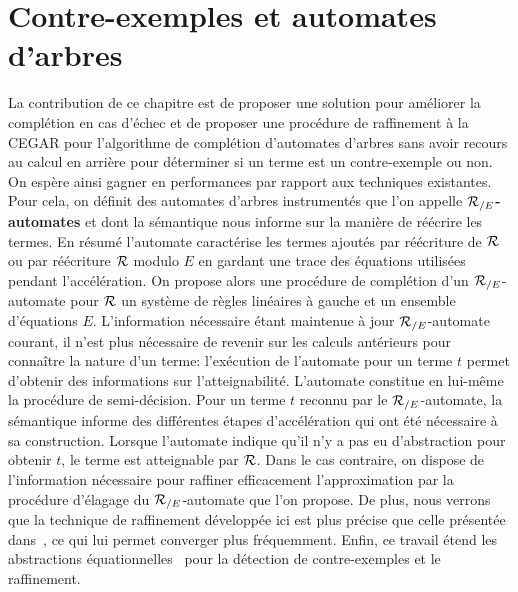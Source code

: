 
\section{Contre-exemples et automates d'arbres}

La contribution de ce chapitre est de proposer une solution pour améliorer
la complétion en cas d'échec et de proposer une procédure de raffinement
à la CEGAR pour l'algorithme de complétion d'automates d'arbres sans avoir recours 
au calcul en arrière pour déterminer si un terme est un contre-exemple ou non.
On espère ainsi gagner en performances par rapport aux techniques existantes.
Pour cela, on définit des automates d'arbres instrumentés que
l'on appelle \textbf{${\mathcal R_{/E}}$-automates} et dont la sémantique 
nous informe sur la manière de réécrire les termes.
En résumé l'automate caractérise les termes ajoutés par réécriture
de $\mathcal R$ ou par réécriture $\mathcal R$ modulo $E$ en gardant une trace
des équations utilisées pendant l'accélération.
On propose alors une procédure de complétion d'un ${\mathcal R_{/E}}$-automate
pour $\mathcal R$ un système de règles linéaires à gauche et un ensemble d'équations $E$.
L'information nécessaire étant maintenue à jour ${\mathcal R_{/E}}$-automate courant, 
il n'est plus nécessaire de revenir sur les calculs antérieurs pour
connaître la nature d'un terme: l'exécution de l'automate pour un terme $t$
permet d'obtenir des informations sur l'atteignabilité. L'automate constitue en lui-même
la procédure de semi-décision.
Pour un terme $t$ reconnu par le ${\mathcal R_{/E}}$-automate, la sémantique informe des différentes étapes
d'accélération qui ont été nécessaire à sa construction. Lorsque l'automate indique qu'il n'y a
pas eu d'abstraction pour obtenir $t$, le terme est atteignable par $\mathcal R$.  Dans le cas
contraire, on dispose de l'information nécessaire pour raffiner efficacement l'approximation par la procédure 
d'élagage du ${\mathcal R_{/E}}$-automate que l'on propose.
De plus, nous verrons que la technique de raffinement développée ici est plus
précise que celle présentée dans~\cite{BCHK08}, ce qui lui permet  
converger plus fréquemment. Enfin, ce travail étend les abstractions
équationnelles~\cite{MeseguerPM-TCS08,Takai-RTA04} pour la détection
de contre-exemples et le raffinement.

